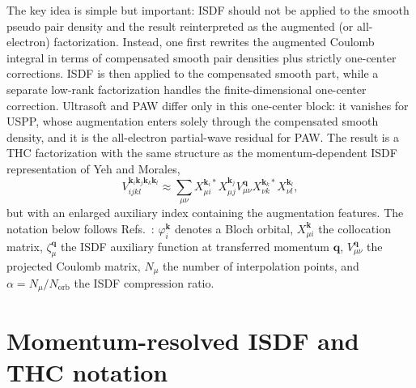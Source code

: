 \documentclass[aps,prb,reprint,superscriptaddress,longbibliography,nofootinbib]{revtex4-2}
\newcommand{\bk}{\mathbf k}
\newcommand{\bq}{\mathbf q}
\newcommand{\orb}{\mathrm{orb}}
\begin{document}
The key idea is simple but important: ISDF should not be applied to the smooth pseudo pair density and the result reinterpreted as the augmented (or all-electron) factorization.  Instead, one first rewrites the augmented Coulomb integral in terms of compensated smooth pair densities plus strictly one-center corrections.  ISDF is then applied to the compensated smooth part, while a separate low-rank factorization handles the finite-dimensional one-center correction.  Ultrasoft and PAW differ only in this one-center block: it vanishes for USPP, whose augmentation enters solely through the compensated smooth density, and it is the all-electron partial-wave residual for PAW.  The result is a THC factorization with the same structure as the momentum-dependent ISDF representation of Yeh and Morales,
\begin{equation}
V_{ijkl}^{\bk_i\bk_j\bk_k\bk_l}
\approx
\sum_{\mu\nu}
X_{\mu i}^{\bk_i *}X_{\mu j}^{\bk_j}
V_{\mu\nu}^{\bq}
X_{\nu k}^{\bk_k *}X_{\nu l}^{\bk_l},
\label{eq:standard-thc-intro}
\end{equation}
but with an enlarged auxiliary index containing the augmentation features.  The notation below follows Refs.~: \(\varphi_i^{\bk}\) denotes a Bloch orbital, \(X_{\mu i}^{\bk}\) the collocation matrix, \(\zeta_\mu^{\bq}\) the ISDF auxiliary function at transferred momentum \(\bq\), \(V_{\mu\nu}^{\bq}\) the projected Coulomb matrix, \(N_\mu\) the number of interpolation points, and \(\alpha=N_\mu/N_{\orb}\) the ISDF compression ratio.

\section{Momentum-resolved ISDF and THC notation}
\label{sec:isdf}
\end{document}
